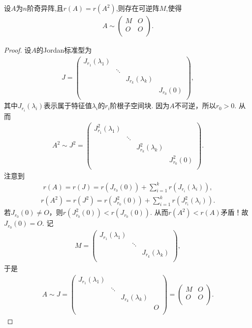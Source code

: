 \documentclass[../../main.tex]{subfiles}
\begin{document}
\begin{proposition}\label{proposition:矩阵开方的秩等于其秩则幂零Jordan块均为1阶}
设$A$为$n$阶奇异阵,且$r(A)=r(A^2)$,则存在可逆阵$M$,使得
\begin{align*}
A\sim \left( \begin{matrix}
M&		O\\
O&		O\\
\end{matrix} \right) .
\end{align*}
\end{proposition}
\begin{proof}
设$A$的Jordan标准型为
\begin{align*}
J=\begin{pmatrix}
J_{r_1}(\lambda_1)&		&		&		\\
&		\ddots&		&		\\
&		&		J_{r_k}(\lambda_k)&		\\
&		&		&		J_{r_0}(0)\\
\end{pmatrix},
\end{align*}
其中$J_{r_i}(\lambda_i)$表示属于特征值$\lambda_i$的$r_i$阶根子空间块. 因为$A$不可逆，所以$r_0>0$. 从而
\begin{align*}
A^2\sim J^2=\begin{pmatrix}
J_{r_1}^{2}(\lambda_1)&		&		&		\\
&		\ddots&		&		\\
&		&		J_{r_k}^{2}(\lambda_k)&		\\
&		&		&		J_{r_0}^{2}(0)\\
\end{pmatrix}.
\end{align*}
注意到
\begin{align*}
r(A)=r(J)=r(J_{r_0}(0))+\sum\limits_{i=1}^k r(J_{r_i}(\lambda_i)),
\end{align*}
\begin{align*}
r(A^2)=r(J^2)=r(J_{r_0}^{2}(0))+\sum\limits_{i=1}^k r(J_{r_i}^{2}(\lambda_i)).
\end{align*}
若$J_{r_0}(0)\ne O$，则$r(J_{r_0}^{2}(0))<r(J_{r_0}(0))$. 从而$r(A^2)<r(A)$矛盾！故$J_{r_0}(0)=O$. 记
\begin{align*}
M=\begin{pmatrix}
J_{r_1}(\lambda_1)&		&		\\
&		\ddots&		\\
&		&		J_{r_k}(\lambda_k)\\
\end{pmatrix},
\end{align*}
于是
\begin{align*}
A\sim J=\begin{pmatrix}
J_{r_1}(\lambda_1)&		&		&		\\
&		\ddots&		&		\\
&		&		J_{r_k}(\lambda_k)&		\\
&		&		&		O\\
\end{pmatrix}=\begin{pmatrix}
M&		O\\
O&		O\\
\end{pmatrix}.
\end{align*}


\end{proof}
\end{document}

